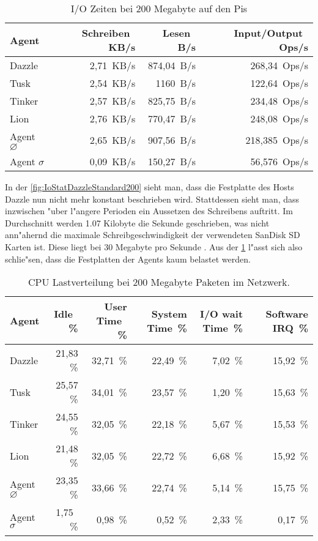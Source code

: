 \begin{table}
\centering
\begin{tabular}{l%
 r<{\,KB/s}%
 r<{\,B/s}%
 r<{\,Ops/s}%
}
Agent	  			& Schreiben	 	& Lesen			& Input/Output 		\\	
\hline
Dazzle 				& 2,71			& 874,04		& 268,34	        \\
Tusk 				& 2,54			& 1160			& 122,64			\\
Tinker				& 2,57 			& 825,75		& 234,48		 	\\
Lion				& 2,76			& 770,47		& 248,08	 	\\
Agent $\diameter $  		& 2,65			& 907,56		& 218,385		\\   
Agent $\sigma $ 		& 0,09  		& 150,27		& 56,576		\\
\end{tabular}
\caption{I/O Zeiten bei 200 Megabyte auf den Pis}
\label{tab:NormalbetriebIoStat200Mb}
\end{table}


In der \cref{fig:IoStatDazzleStandard200} sieht man, dass die Festplatte des Hosts Dazzle nun nicht %
mehr konstant beschrieben wird. Stattdessen sieht man, dass inzwischen "uber l"angere Perioden %
ein Aussetzen des Schreibens auftritt. Im Durchschnitt werden 1.07 Kilobyte die Sekunde geschrieben, %
was nicht ann"ahernd die maximale Schreibgeschwindigkeit der verwendeten %
SanDisk SD Karten ist. Diese liegt bei 30 Megabyte pro Sekunde \autocite{san:sd}. %
Aus der \cref{tab:NormalbetriebIoStat200Mb} l"asst sich also schlie"sen, dass die Festplatten der Agents kaum belastet werden. %

\begin{table}
\centering
\begin{tabular}{l%
 r<{\,\%}%
 r<{\,\%}%
 r<{\,\%}%
 r<{\,\%}%
 r<{\,\%}%
}
Agent  				& Idle			& User Time		& System Time		& I/O wait Time	& Software IRQ	\\
\hline
Dazzle 				& 21,83			& 32,71			& 22,49 		& 7,02		& 15,92	\\
Tusk 				& 25,57			& 34,01			& 23,57			& 1,20		& 15,63	\\
Tinker				& 24,55			& 32,05			& 22,18			& 5,67		& 15,53	\\
Lion				& 21,48			& 32,05			& 22,72			& 6,68		& 15,92	\\ 
Agent $\diameter $  		& 23,35			& 33,66			& 22,74			& 5,14	 	& 15,75	\\   
Agent $\sigma $			&  1,75			&  0,98			&  0,52			& 2,33		& 0,17  \\ 

\end{tabular}
\caption{CPU Lastverteilung bei 200 Megabyte Paketen im Netzwerk.}
\label{tab:CPUlastverteilung200Mb}
\end{table}

